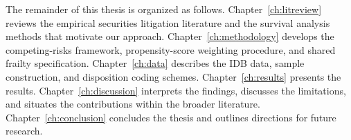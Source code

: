The remainder of this thesis is organized as follows.
Chapter~\ref{ch:litreview} reviews the empirical securities
litigation literature and the survival analysis methods that
motivate our approach. Chapter~\ref{ch:methodology} develops
the competing-risks framework, propensity-score weighting
procedure, and shared frailty specification.
Chapter~\ref{ch:data} describes the IDB data, sample
construction, and disposition coding schemes.
Chapter~\ref{ch:results} presents the results.
Chapter~\ref{ch:discussion} interprets the findings,
discusses the limitations, and situates the contributions within
the broader literature. Chapter~\ref{ch:conclusion} concludes
the thesis and outlines directions for future research.
